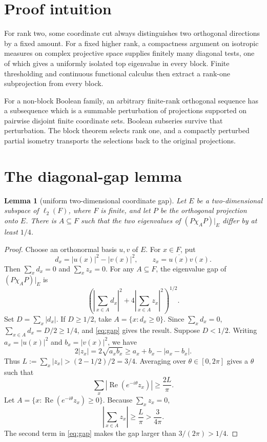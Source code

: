 \documentclass[11pt]{article}
\newtheorem{lemma}[theorem]{Lemma}
\newcommand{\ellTwo}{\ell_2}
\begin{document}
\section{Proof intuition}
For rank two, some coordinate cut always distinguishes two orthogonal
directions by a fixed amount.  For a fixed higher rank, a compactness
argument on isotropic measures on complex projective space supplies finitely
many diagonal tests, one of which gives a uniformly isolated top eigenvalue
in every block.  Finite thresholding and continuous functional calculus then
extract a rank-one subprojection from every block.

For a non-block Boolean family, an arbitrary finite-rank orthogonal sequence
has a subsequence which is a summable perturbation of projections supported
on pairwise disjoint finite coordinate sets.  Boolean subseries survive that
perturbation.  The block theorem selects rank one, and a compactly perturbed
partial isometry transports the selections back to the original projections.
\section{The diagonal-gap lemma}
\begin{lemma}[uniform two-dimensional coordinate gap]\label{lem:gap}
Let $E$ be a two-dimensional subspace of $\ellTwo(F)$, where $F$ is finite,
and let $P$ be the orthogonal projection onto $E$. There is $A\subseteq F$
such that the two eigenvalues of $(P\chi_A P)|_E$ differ by at least $1/4$.
\end{lemma}
\begin{proof}
Choose an orthonormal basis $u,v$ of $E$. For $x\in F$, put
\[
 d_x=|u(x)|^2-|v(x)|^2,\qquad z_x=\overline{u(x)}v(x).
\]
Then $\sum_xd_x=0$ and $\sum_xz_x=0$. For any $A\subseteq F$, the
eigenvalue gap of $(P\chi_A P)|_E$ is
\begin{equation}\label{eq:gap}
 \left(\left|\sum_{x\in A}d_x\right|^2+
 4\left|\sum_{x\in A}z_x\right|^2\right)^{1/2}.
\end{equation}
Set $D=\sum_x|d_x|$. If $D\geq 1/2$, take
$A=\{x:d_x\geq0\}$. Since $\sum_xd_x=0$,
$\sum_{x\in A}d_x=D/2\geq1/4$, and \eqref{eq:gap} gives the result.
Suppose $D<1/2$. Writing $a_x=|u(x)|^2$ and $b_x=|v(x)|^2$, we have
\[
 2|z_x|=2\sqrt{a_xb_x}\geq a_x+b_x-|a_x-b_x|.
\]
Thus $L:=\sum_x|z_x|>(2-1/2)/2=3/4$. Averaging over
$\theta\in[0,2\pi]$ gives a $\theta$ such that
\[
 \sum_x\left|\operatorname{Re}(e^{-i\theta}z_x)\right|\geq\frac{2L}{\pi}.
\]
Let $A=\{x:\operatorname{Re}(e^{-i\theta}z_x)\geq0\}$. Because
$\sum_xz_x=0$,
\[
 \left|\sum_{x\in A}z_x\right|\geq\frac{L}{\pi}>\frac{3}{4\pi}.
\]
The second term in \eqref{eq:gap} makes the gap larger than
$3/(2\pi)>1/4$.
\end{proof}
\end{document}
